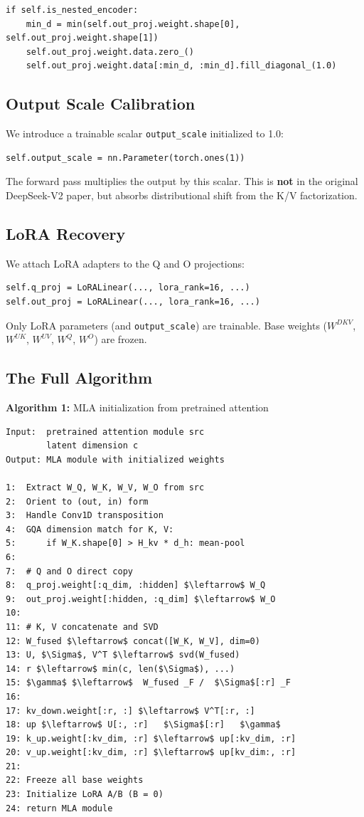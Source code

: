 \begin{lstlisting}
if self.is_nested_encoder:
    min_d = min(self.out_proj.weight.shape[0], self.out_proj.weight.shape[1])
    self.out_proj.weight.data.zero_()
    self.out_proj.weight.data[:min_d, :min_d].fill_diagonal_(1.0)
\end{lstlisting}

\subsection{Output Scale Calibration}

We introduce a trainable scalar \texttt{output\_scale} initialized to 1.0:

\begin{lstlisting}
self.output_scale = nn.Parameter(torch.ones(1))
\end{lstlisting}

The forward pass multiplies the output by this scalar. This is \textbf{not} in 
the original DeepSeek-V2 paper, but absorbs distributional shift from the 
K/V factorization.

\subsection{LoRA Recovery}

We attach LoRA adapters to the Q and O projections:

\begin{lstlisting}
self.q_proj = LoRALinear(..., lora_rank=16, ...)
self.out_proj = LoRALinear(..., lora_rank=16, ...)
\end{lstlisting}

Only LoRA parameters (and \texttt{output\_scale}) are trainable. Base weights 
($W^{DKV}$, $W^{UK}$, $W^{UV}$, $W^Q$, $W^O$) are frozen.

\subsection{The Full Algorithm}

\textbf{Algorithm 1:} MLA initialization from pretrained attention
\begin{lstlisting}
Input:  pretrained attention module src
        latent dimension c
Output: MLA module with initialized weights

1:  Extract W_Q, W_K, W_V, W_O from src
2:  Orient to (out, in) form
3:  Handle Conv1D transposition
4:  GQA dimension match for K, V:
5:      if W_K.shape[0] > H_kv * d_h: mean-pool
6:
7:  # Q and O direct copy
8:  q_proj.weight[:q_dim, :hidden] $\leftarrow$ W_Q
9:  out_proj.weight[:hidden, :q_dim] $\leftarrow$ W_O
10:
11: # K, V concatenate and SVD
12: W_fused $\leftarrow$ concat([W_K, W_V], dim=0)
13: U, $\Sigma$, V^T $\leftarrow$ svd(W_fused)
14: r $\leftarrow$ min(c, len($\Sigma$), ...)
15: $\gamma$ $\leftarrow$  W_fused _F /  $\Sigma$[:r] _F
16:
17: kv_down.weight[:r, :] $\leftarrow$ V^T[:r, :]
18: up $\leftarrow$ U[:, :r]   $\Sigma$[:r]   $\gamma$
19: k_up.weight[:kv_dim, :r] $\leftarrow$ up[:kv_dim, :r]
20: v_up.weight[:kv_dim, :r] $\leftarrow$ up[kv_dim:, :r]
21:
22: Freeze all base weights
23: Initialize LoRA A/B (B = 0)
24: return MLA module
\end{lstlisting}


